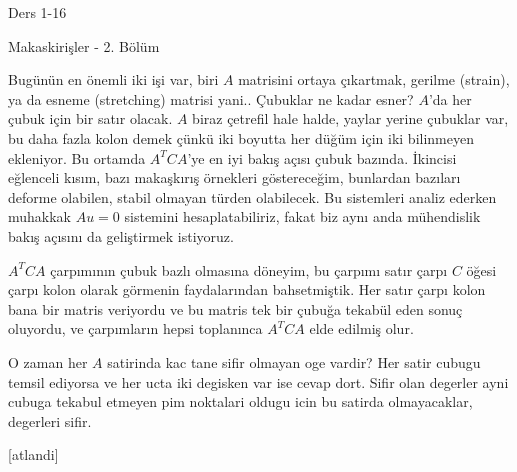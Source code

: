 \documentclass[12pt,fleqn]{article}\usepackage{../../common}
\begin{document}
Ders 1-16

Makaskirişler - 2. Bölüm

Bugünün en önemli iki işi var, biri $A$ matrisini ortaya çıkartmak, gerilme
(strain), ya da esneme (stretching) matrisi yani.. Çubuklar ne kadar esner?
$A$'da her çubuk için bir satır olacak. $A$ biraz çetrefil hale halde, yaylar
yerine çubuklar var, bu daha fazla kolon demek çünkü iki boyutta her düğüm için
iki bilinmeyen ekleniyor. Bu ortamda $A^T C A$'ye en iyi bakış açısı çubuk
bazında. İkincisi eğlenceli kısım, bazı makaşkırış örnekleri göstereceğim,
bunlardan bazıları deforme olabilen, stabil olmayan türden olabilecek.
Bu sistemleri analiz ederken muhakkak $Au = 0$ sistemini hesaplatabiliriz,
fakat biz aynı anda  mühendislik bakış açısını da geliştirmek istiyoruz.

$A^T C A$ çarpımının çubuk bazlı olmasına döneyim, bu çarpımı satır çarpı $C$
öğesi çarpı kolon olarak görmenin faydalarından bahsetmiştik. Her satır çarpı
kolon bana bir matris veriyordu ve bu matris tek bir çubuğa tekabül eden sonuç
oluyordu, ve çarpımların hepsi toplanınca $A^T C A$ elde edilmiş olur.

O zaman her $A$ satirinda kac tane sifir olmayan oge vardir? Her satir cubugu
temsil ediyorsa ve her ucta iki degisken var ise cevap dort. Sifir olan degerler
ayni cubuga tekabul etmeyen pim noktalari oldugu icin bu satirda olmayacaklar,
degerleri sifir.

[atlandi]
\end{document}
